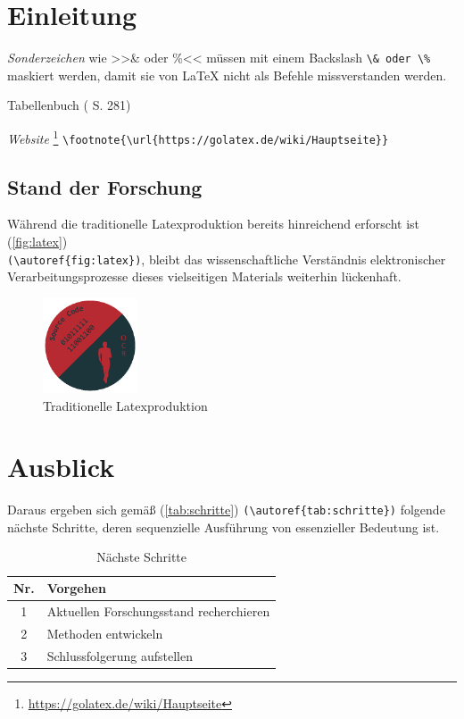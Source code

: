 \section*{Einleitung}

\emph{Sonderzeichen}  wie >>\& oder \%<< müssen mit einem Backslash \verb|\& oder \%| maskiert werden, 
damit sie von LaTeX nicht als Befehle missverstanden werden.

Tabellenbuch (\textcite{bell:2021:tabellenbuchKfz} S. 281)

\emph{Website} \footnote{\url{https://golatex.de/wiki/Hauptseite}} \verb|\footnote{\url{https://golatex.de/wiki/Hauptseite}}| 


\clearpage
\subsection*{Stand der Forschung}

Während die traditionelle Latexproduktion bereits hinreichend erforscht ist (\autoref{fig:latex}) \\
\verb|(\autoref{fig:latex})|, bleibt das wissenschaftliche Verständnis elektronischer Verarbeitungsprozesse dieses 
vielseitigen Materials weiterhin lückenhaft. 


\begin{figure}[!h]%
	\centering
	\includegraphics[width=0.25\textwidth]{images/Logo/logo.eps}
	\caption{Traditionelle Latexproduktion}\label{fig:latex}%
\end{figure}

\clearpage
\section*{Ausblick}

Daraus ergeben sich gemäß (\autoref{tab:schritte}) \verb|(\autoref{tab:schritte})| folgende nächste Schritte, 
deren sequenzielle Ausführung von essenzieller Bedeutung ist.

\begin{table}[!h]%
	\centering
	\begin{tabular}{@{}cl@{}}%
		\toprule
		\textbf{Nr.} & \textbf{Vorgehen} \\
		\midrule
		1 & Aktuellen Forschungsstand recherchieren \\
		2 & Methoden entwickeln \\
		3 & Schlussfolgerung aufstellen \\
		\bottomrule
	\end{tabular}
	\caption{Nächste Schritte}\label{tab:schritte}
\end{table}


